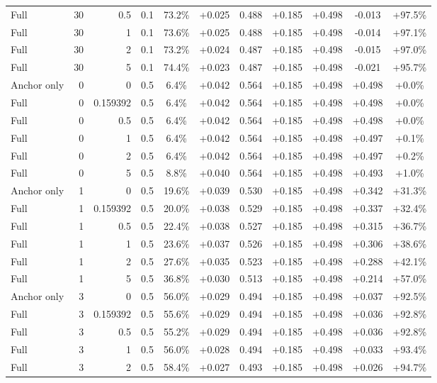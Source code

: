 \begin{table}[htbp]
\begin{tabular}{lrrrccccccc}
Full & 30 & 0.5 & 0.1 & 73.2\% & +0.025 & 0.488 & +0.185 & +0.498 & -0.013 & +97.5\% \\
Full & 30 & 1 & 0.1 & 73.6\% & +0.025 & 0.488 & +0.185 & +0.498 & -0.014 & +97.1\% \\
Full & 30 & 2 & 0.1 & 73.2\% & +0.024 & 0.487 & +0.185 & +0.498 & -0.015 & +97.0\% \\
Full & 30 & 5 & 0.1 & 74.4\% & +0.023 & 0.487 & +0.185 & +0.498 & -0.021 & +95.7\% \\
Anchor only & 0 & 0 & 0.5 & 6.4\% & +0.042 & 0.564 & +0.185 & +0.498 & +0.498 & +0.0\% \\
Full & 0 & 0.159392 & 0.5 & 6.4\% & +0.042 & 0.564 & +0.185 & +0.498 & +0.498 & +0.0\% \\
Full & 0 & 0.5 & 0.5 & 6.4\% & +0.042 & 0.564 & +0.185 & +0.498 & +0.498 & +0.0\% \\
Full & 0 & 1 & 0.5 & 6.4\% & +0.042 & 0.564 & +0.185 & +0.498 & +0.497 & +0.1\% \\
Full & 0 & 2 & 0.5 & 6.4\% & +0.042 & 0.564 & +0.185 & +0.498 & +0.497 & +0.2\% \\
Full & 0 & 5 & 0.5 & 8.8\% & +0.040 & 0.564 & +0.185 & +0.498 & +0.493 & +1.0\% \\
Anchor only & 1 & 0 & 0.5 & 19.6\% & +0.039 & 0.530 & +0.185 & +0.498 & +0.342 & +31.3\% \\
Full & 1 & 0.159392 & 0.5 & 20.0\% & +0.038 & 0.529 & +0.185 & +0.498 & +0.337 & +32.4\% \\
Full & 1 & 0.5 & 0.5 & 22.4\% & +0.038 & 0.527 & +0.185 & +0.498 & +0.315 & +36.7\% \\
Full & 1 & 1 & 0.5 & 23.6\% & +0.037 & 0.526 & +0.185 & +0.498 & +0.306 & +38.6\% \\
Full & 1 & 2 & 0.5 & 27.6\% & +0.035 & 0.523 & +0.185 & +0.498 & +0.288 & +42.1\% \\
Full & 1 & 5 & 0.5 & 36.8\% & +0.030 & 0.513 & +0.185 & +0.498 & +0.214 & +57.0\% \\
Anchor only & 3 & 0 & 0.5 & 56.0\% & +0.029 & 0.494 & +0.185 & +0.498 & +0.037 & +92.5\% \\
Full & 3 & 0.159392 & 0.5 & 55.6\% & +0.029 & 0.494 & +0.185 & +0.498 & +0.036 & +92.8\% \\
Full & 3 & 0.5 & 0.5 & 55.2\% & +0.029 & 0.494 & +0.185 & +0.498 & +0.036 & +92.8\% \\
Full & 3 & 1 & 0.5 & 56.0\% & +0.028 & 0.494 & +0.185 & +0.498 & +0.033 & +93.4\% \\
Full & 3 & 2 & 0.5 & 58.4\% & +0.027 & 0.493 & +0.185 & +0.498 & +0.026 & +94.7\% \\

\end{tabular}
\end{table}

